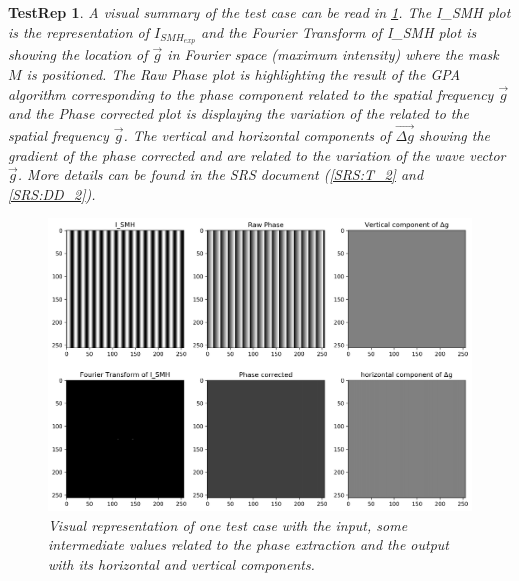 \documentclass[12pt, titlepage]{article}
\newtheorem{TestRep}{TestRep}
\begin{document}
\begin{TestRep}
A visual summary of the test case can be read in \cref{fig:Test_2_explanation}. The I{\_}SMH plot is the representation of $I_{SMH_{exp}}$ and the Fourier Transform of I{\_}SMH plot is showing the location of $\overrightarrow{g}$ in Fourier space (maximum intensity) where the mask $M$ is positioned. The Raw Phase plot is highlighting the result of the GPA algorithm corresponding to the phase component related to the spatial frequency $\overrightarrow{g}$ and the Phase corrected plot is displaying the variation of the related to the spatial frequency $\overrightarrow{g}$. The vertical and horizontal components of $\overrightarrow{\Delta g}$ showing the gradient of the phase corrected and are related to the variation of the wave vector $\overrightarrow{g}$. More details can be found in the SRS document (\cref{SRS:T_2} and \cref{SRS:DD_2}).

\begin{figure}[H]
\begin{center}
\includegraphics[scale=0.5]{Figures/Test_2_explanation.png}
\caption{Visual representation of one test case with the input, some intermediate values related to the phase extraction and the output with its horizontal and vertical components.}
\label{fig:Test_2_explanation}
\end{center}
\end{figure}


\end{TestRep}
\end{document}
